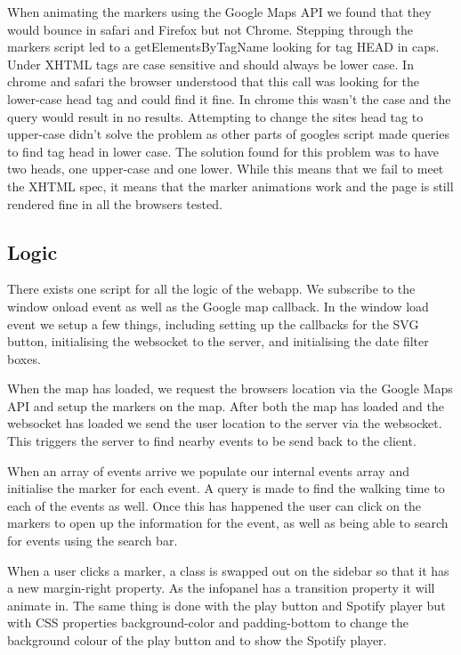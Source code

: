 \documentclass[10pt]{article}
\begin{document}
                When animating the markers using the Google Maps API we found that they would bounce in safari and Firefox but not Chrome. Stepping through the markers script led to a getElementsByTagName looking for tag HEAD in caps. Under XHTML tags are case sensitive and should always be lower case. In chrome and safari the browser understood that this call was looking for the lower-case head tag and could find it fine. In chrome this wasn't the case and the query would result in no results. Attempting to change the sites head tag to upper-case didn't solve the problem as other parts of googles script made queries to find tag head in lower case. The solution found for this problem was to have two heads, one upper-case and one lower. While this means that we fail to meet the XHTML spec, it means that the marker animations work and the page is still rendered fine in all the browsers tested.

        \subsection{Logic}
            There exists one script for all the logic of the webapp. We subscribe to the window onload event as well as the Google map callback. In the window load event we setup a few things, including setting up the callbacks for the SVG button, initialising the websocket to the server, and initialising the date filter boxes.

            When the map has loaded, we request the browsers location via the Google Maps API and setup the markers on the map. After both the map has loaded and the websocket has loaded we send the user location to the server via the websocket. This triggers the server to find nearby events to be send back to the client.

            When an array of events arrive we populate our internal events array and initialise the marker for each event. A query is made to find the walking time to each of the events as well. Once this has happened the user can click on the markers to open up the information for the event, as well as being able to search for events using the search bar.

            When a user clicks a marker, a class is swapped out on the sidebar so that it has a new margin-right property. As the infopanel has a transition property it will animate in. The same thing is done with the play button and Spotify player but with CSS properties background-color and padding-bottom to change the background colour of the play button and to show the Spotify player.
\end{document}
